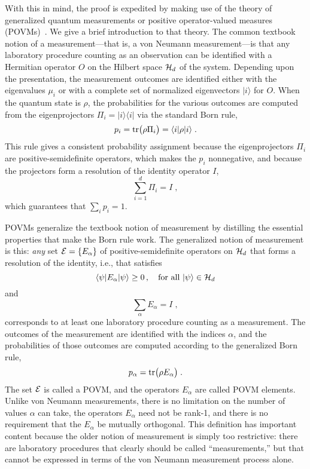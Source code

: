With this in mind, the proof is expedited by making use of the
theory of generalized quantum measurements or positive
operator-valued measures (POVMs)~\cite{Peres1993a,Kraus1983}.  We
give a brief introduction to that theory. The common textbook
notion of a measurement---that is, a von Neumann measurement---is
that any laboratory procedure counting as an observation can be
identified with a Hermitian operator $O$ on the Hilbert space
${\cal H}_d$ of the system. Depending upon the presentation, the
measurement outcomes are identified either with the eigenvalues
$\mu_i$ or with a complete set of normalized eigenvectors
$|i\rangle$ for $O$. When the quantum state is $\rho$, the
probabilities for the various outcomes are computed from the
eigenprojectors $\Pi_i=|i\rangle\langle i|$ via the standard Born
rule,
\begin{equation}
p_i={\rm tr}\big(\rho\Pi_i\big) = \langle i|\rho|i\rangle\;.
\end{equation}
This rule gives a consistent probability assignment because the
eigenprojectors $\Pi_i$ are positive-semidefinite operators, which
makes the $p_i$ nonnegative, and because the projectors form a
resolution of the identity operator $I$,
\begin{equation}
\sum_{i=1}^d \Pi_i = I\;,
\end{equation}
which guarantees that $\sum_i p_i=1$.

POVMs generalize the textbook notion of measurement by distilling
the essential properties that make the Born rule work.  The
generalized notion of measurement is this:  {\it any\/} set ${\cal
E}=\{E_\alpha\}$ of positive-semidefinite operators  on ${\cal
H}_d$ that forms a resolution of the identity, i.e., that
satisfies
\begin{equation}
\langle\psi|E_\alpha|\psi\rangle\ge0\,,\quad\mbox{for all
$|\psi\rangle\in{\cal H}_d$}
\label{Hank}
\end{equation}
and
\begin{equation}
\sum_\alpha E_\alpha = I\;,
\label{Hannibal}
\end{equation}
corresponds to at least one laboratory procedure counting as a
measurement. The outcomes of the measurement are identified with the
indices $\alpha$, and the probabilities of those outcomes are
computed according to the generalized Born rule,
\begin{equation}
p_\alpha={\rm tr}\big(\rho E_\alpha\big) \;.
\end{equation}
The set ${\cal E}$ is called a POVM, and the operators $E_\alpha$
are called POVM elements. Unlike von Neumann measurements, there
is no limitation on the number of values $\alpha$ can take, the
operators $E_\alpha$ need not be rank-1, and there is no
requirement that the $E_\alpha$ be mutually orthogonal.  This
definition has important content because the older notion of
measurement is simply too restrictive: there are laboratory
procedures that clearly should be called ``measurements,'' but
that cannot be expressed in terms of the von Neumann measurement
process alone.

